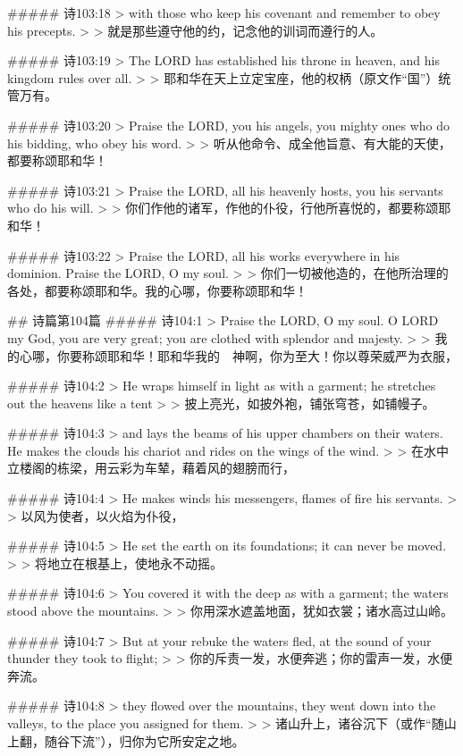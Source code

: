 ##### 诗103:18
> with those who keep his covenant and remember to obey his precepts.
>
> 就是那些遵守他的约，记念他的训词而遵行的人。


##### 诗103:19
> The LORD has established his throne in heaven, and his kingdom rules over all.
>
> 耶和华在天上立定宝座，他的权柄（原文作“国”）统管万有。


##### 诗103:20
> Praise the LORD, you his angels, you mighty ones who do his bidding, who obey his word.
>
> 听从他命令、成全他旨意、有大能的天使，都要称颂耶和华！


##### 诗103:21
> Praise the LORD, all his heavenly hosts, you his servants who do his will.
>
> 你们作他的诸军，作他的仆役，行他所喜悦的，都要称颂耶和华！


##### 诗103:22
> Praise the LORD, all his works everywhere in his dominion. Praise the LORD, O my soul.
>
> 你们一切被他造的，在他所治理的各处，都要称颂耶和华。我的心哪，你要称颂耶和华！


## 诗篇第104篇
##### 诗104:1
> Praise the LORD, O my soul. O LORD my God, you are very great; you are clothed with splendor and majesty.
>
> 我的心哪，你要称颂耶和华！耶和华我的　神啊，你为至大！你以尊荣威严为衣服，


##### 诗104:2
> He wraps himself in light as with a garment; he stretches out the heavens like a tent
>
> 披上亮光，如披外袍，铺张穹苍，如铺幔子。


##### 诗104:3
> and lays the beams of his upper chambers on their waters. He makes the clouds his chariot and rides on the wings of the wind.
>
> 在水中立楼阁的栋梁，用云彩为车辇，藉着风的翅膀而行，


##### 诗104:4
> He makes winds his messengers, flames of fire his servants.
>
> 以风为使者，以火焰为仆役，


##### 诗104:5
> He set the earth on its foundations; it can never be moved.
>
> 将地立在根基上，使地永不动摇。


##### 诗104:6
> You covered it with the deep as with a garment; the waters stood above the mountains.
>
> 你用深水遮盖地面，犹如衣裳；诸水高过山岭。


##### 诗104:7
> But at your rebuke the waters fled, at the sound of your thunder they took to flight;
>
> 你的斥责一发，水便奔逃；你的雷声一发，水便奔流。


##### 诗104:8
> they flowed over the mountains, they went down into the valleys, to the place you assigned for them.
>
> 诸山升上，诸谷沉下（或作“随山上翻，随谷下流”），归你为它所安定之地。


